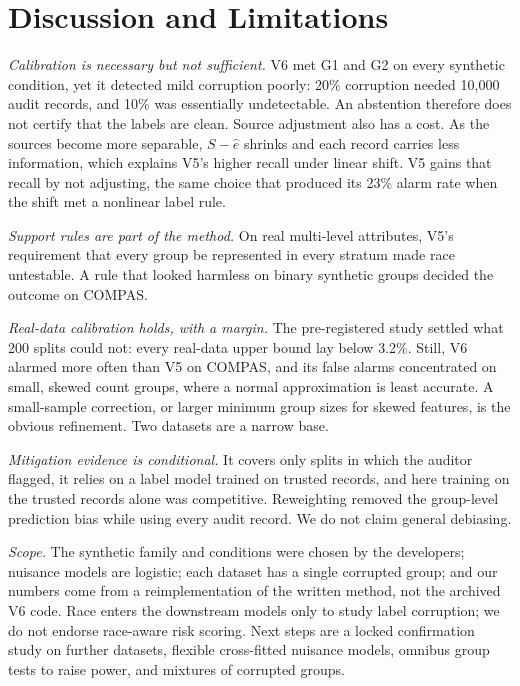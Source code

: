 \documentclass[conference]{IEEEtran}
\newcommand{\Vsix}{V6}
\newcommand{\Vfive}{V5}
\begin{document}
\section{Discussion and Limitations}
\label{sec:discussion}
\emph{Calibration is necessary but not sufficient.} \Vsix{} met G1 and G2 on every synthetic condition, yet it detected mild corruption poorly: 20\% corruption needed 10,000 audit records, and 10\% was essentially undetectable. An abstention therefore does not certify that the labels are clean. Source adjustment also has a cost. As the sources become more separable, $S-\hat e$ shrinks and each record carries less information, which explains \Vfive's higher recall under linear shift. \Vfive{} gains that recall by not adjusting, the same choice that produced its 23\% alarm rate when the shift met a nonlinear label rule.

\emph{Support rules are part of the method.} On real multi-level attributes, \Vfive's requirement that every group be represented in every stratum made race untestable. A rule that looked harmless on binary synthetic groups decided the outcome on COMPAS.

\emph{Real-data calibration holds, with a margin.} The pre-registered study settled what 200 splits could not: every real-data upper bound lay below 3.2\%. Still, \Vsix{} alarmed more often than \Vfive{} on COMPAS, and its false alarms concentrated on small, skewed count groups, where a normal approximation is least accurate. A small-sample correction, or larger minimum group sizes for skewed features, is the obvious refinement. Two datasets are a narrow base.

\emph{Mitigation evidence is conditional.} It covers only splits in which the auditor flagged, it relies on a label model trained on trusted records, and here training on the trusted records alone was competitive. Reweighting removed the group-level prediction bias while using every audit record. We do not claim general debiasing.

\emph{Scope.} The synthetic family and conditions were chosen by the developers; nuisance models are logistic; each dataset has a single corrupted group; and our numbers come from a reimplementation of the written method, not the archived \Vsix{} code. Race enters the downstream models only to study label corruption; we do not endorse race-aware risk scoring. Next steps are a locked confirmation study on further datasets, flexible cross-fitted nuisance models, omnibus group tests to raise power, and mixtures of corrupted groups.
\end{document}
